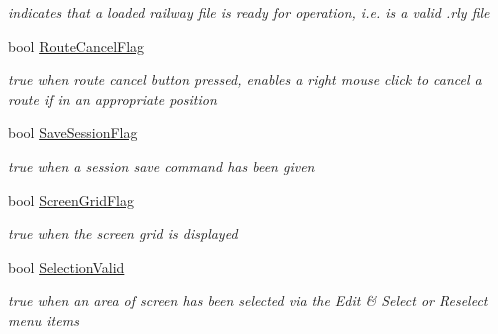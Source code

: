\begin{DoxyCompactItemize}
\begin{DoxyCompactList}\small\item\em indicates that a loaded railway file is ready for operation, i.\+e. is a valid .rly file \end{DoxyCompactList}\item 
\mbox{\label{class_t_interface_afc8aaa4cf65f06e0581613757c2d0142}} 
bool \mbox{\hyperlink{class_t_interface_afc8aaa4cf65f06e0581613757c2d0142}{Route\+Cancel\+Flag}}
\begin{DoxyCompactList}\small\item\em true when route cancel button pressed, enables a right mouse click to cancel a route if in an appropriate position \end{DoxyCompactList}\item 
\mbox{\label{class_t_interface_a57de4da88e1f7b92144a768342b383b5}} 
bool \mbox{\hyperlink{class_t_interface_a57de4da88e1f7b92144a768342b383b5}{Save\+Session\+Flag}}
\begin{DoxyCompactList}\small\item\em true when a session save command has been given \end{DoxyCompactList}\item 
\mbox{\label{class_t_interface_acdf9f264f6d9a029c3b450531bb9ab82}} 
bool \mbox{\hyperlink{class_t_interface_acdf9f264f6d9a029c3b450531bb9ab82}{Screen\+Grid\+Flag}}
\begin{DoxyCompactList}\small\item\em true when the screen grid is displayed \end{DoxyCompactList}\item 
\mbox{\label{class_t_interface_aec3cbc0eb5567fcd93dd03d463dc066b}} 
bool \mbox{\hyperlink{class_t_interface_aec3cbc0eb5567fcd93dd03d463dc066b}{Selection\+Valid}}
\begin{DoxyCompactList}\small\item\em true when an area of screen has been selected via the \textquotesingle{}Edit\textquotesingle{} \& \textquotesingle{}Select\textquotesingle{} or \textquotesingle{}Reselect\textquotesingle{} menu items \end{DoxyCompactList}\item 
\mbox{\label{class_t_interface_abecb64b29fef5bd8b3e8f38e94987dfb}} 

\end{DoxyCompactItemize}
